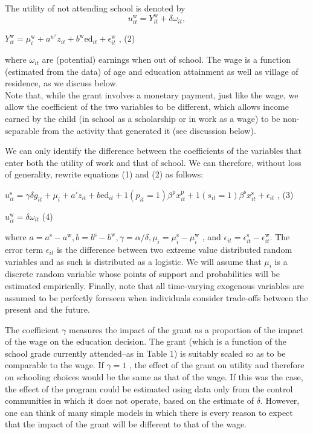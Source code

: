 \documentclass{handoutForSolutions}
\begin{document}
The utility of not attending school is denoted by
$$
u_{it}^{\mathrm{w}}=Y_{it}^{\mathrm{w}}+\delta\omega_{it},
$$
\begin{center}
$Y_{it}^{\mathrm{w}}=\mu_{i}^{\mathrm{w}}+a^{w'}z_{it}+b^{\mathrm{w}}\mathrm{e}\mathrm{d}_{it}+\epsilon_{it}^{\mathrm{w}}$ ,   (2)
\end{center}
where $\omega_{it}$ are (potential) earnings when out of school. The wage is a function (estimated from the data) of age and education attainment as well as village of residence, as we discuss below.\\

Note that, while the grant involves a monetary payment, just like the wage, we allow the coefficient of the two variables to be different, which allows income earned by the child (in school as a scholarship or in work as a wage) to be non-separable from the activity that generated it (see discussion below).

We can only identify the difference between the coefficients of the variables that enter both the utility of work and that of school. We can therefore, without loss of generality, rewrite equations (1) and (2) as follows:
\begin{center}
$u_{it}^{\mathrm{s}}=\gamma\delta g_{it}+\mu_{i}+a'z_{it}+b\mathrm{e}\mathrm{d}_{it}+1(p_{it}=1)\beta^{\mathrm{p}}x_{it}^{\mathrm{p}}+1(s_{it}=1)\beta^{\mathrm{s}}x_{it}^{\mathrm{s}}+\epsilon_{it}$ ,   (3)

$u_{it}^{\mathrm{w}}=\delta\omega_{it}$   (4)
\end{center}
where $a=a^{\mathrm{s}}-a^{\mathrm{w}}, b=b^{\mathrm{s}}-b^{\mathrm{w}}, \gamma =\alpha/\delta, \mu_{i}=\mu_{i}^{\mathrm{s}}-\mu_{i}^{\mathrm{w}}$ , and $\epsilon_{it}=\epsilon_{it}^{\mathrm{s}}-\epsilon_{it}^{\mathrm{w}}$. The error term $\epsilon_{it}$ is the difference between two extreme value distributed random variables and as such is distributed as a logistic. We will assume that $\mu_{i}$ is a discrete random variable whose points of support and probabilities will be estimated empirically. Finally, note that all time-varying exogenous variables are assumed to be perfectly foreseen when individuals consider trade-offs between the present and the future.

The coefficient $\gamma$ measures the impact of the grant as a proportion of the impact of the wage on the education decision. The grant (which is a function of the school grade currently attended--as in Table 1) is suitably scaled so as to be comparable to the wage. If $\gamma =1$ , the effect of the grant on utility and therefore on schooling choices would be the same as that of the wage. If this was the case, the effect of the program could be estimated using data only from the control communities in which it does not operate, based on the estimate of $\delta$. However, one can think of many simple models in which there is every reason to expect that the impact of the grant will be different to that of the wage.
\end{document}
